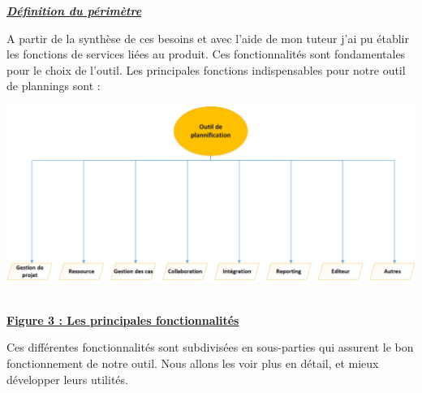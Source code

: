 \documentclass[11pt]{report}
\begin{document}
\hspace{1cm} \underline{\textbf{\textit{Définition du périmètre}}}
\quad

\hspace{1cm} A partir de la synthèse de ces besoins et avec l’aide de mon tuteur j’ai pu établir les fonctions de services liées au produit. Ces fonctionnalités sont fondamentales pour le choix de l’outil. Les principales fonctions indispensables pour notre outil de plannings sont :  

\begin{center}
\includegraphics[scale=0.5]{images/figure3.png} \

\underline{\textbf{Figure 3 : Les principales fonctionnalités}}
\end{center}
\quad

Ces différentes fonctionnalités sont subdivisées en sous-parties qui assurent le bon fonctionnement de notre outil. Nous allons les voir plus en détail, et mieux développer leurs utilités.\\
\end{document}
